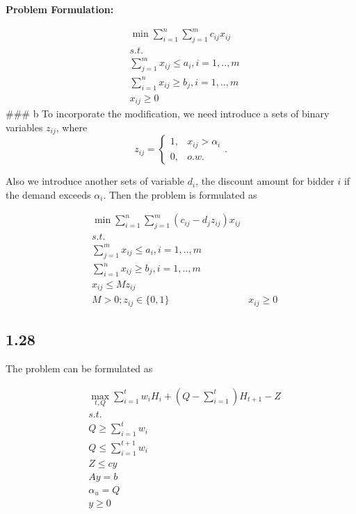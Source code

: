 \documentclass[11pt]{article}
\begin{document}
\textbf{Problem Formulation:}

\[
\begin{align*}
    & \min \sum_{i=1}^n\sum_{j=1}^m c_{ij}x_{ij} \\
    & s.t. \\
    & \sum_{j=1}^m x_{ij}\leq a_i, i=1,..,m\\
    & \sum_{i=1}^n x_{ij}\geq b_j, i=1,..,m\\
    & x_{ij} \geq 0
 \end{align*}
\] \#\#\# b To incorporate the modification, we need introduce a sets of
binary variables \(z_{ij}\), where \[
z_{ij} = 
\begin{cases}
1, & x_{ij} > \alpha_i \\
0, & o.w.
\end{cases}.
\]

Also we introduce another sets of variable \(d_{i}\), the discount
amount for bidder \(i\) if the demand exceeds \(\alpha_i\). Then the
problem is formulated as

\[
\begin{align*}
    & \min \sum_{i=1}^n\sum_{j=1}^m (c_{ij}- d_jz_{ij})x_{ij} \\
    & s.t. \\
    & \sum_{j=1}^m x_{ij}\leq a_i, i=1,..,m\\
    & \sum_{i=1}^n x_{ij}\geq b_j, i=1,..,m\\
    & x_{ij}\leq M{z_{ij}} \\
    & M >0; z_{ij} \in \{0,1\}
    & x_{ij} \geq 0
 \end{align*}
\]

    \hypertarget{section}{%
\subsection{1.28}\label{section}}

The problem can be formulated as

\[
\begin{align*}
    & \max_{t,Q} \sum_{i=1}^t w_iH_i + (Q - \sum_{i=1}^t)H_{t+1} - Z \\
    & s.t. \\
    & Q \geq \sum_{i=1}^t w_i \\
    & Q \leq \sum_{i=1}^{t+1} w_i \\
    & Z \leq cy \\
    & Ay = b\\
    & \alpha_ u = Q\\
    & y \geq 0
 \end{align*}
\]
\end{document}
